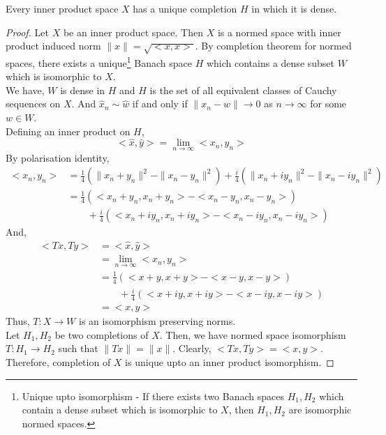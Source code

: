 \begin{theorem}
	Every inner product space $X$ has a unique completion $H$ in which it is dense.
\end{theorem}
\begin{proof}
	Let $X$ be an inner product space.
	Then $X$ is a normed space with inner product induced norm $\|x\| = \sqrt{<x,x>}$.
	By completion theorem for normed spaces, there exists a unique\dag\footnote{
		Unique upto isomorphism - 
		If there exists two Banach spaces $H_1,H_2$ which contain a dense subset which is isomorphic to $X$, then $H_1,H_2$ are isomorphic normed spaces.} 
	Banach space $H$ which contains a dense subset $W$ which is isomorphic to $X$.\\
	
	We have, $W$ is dense in $H$ and $H$ is the set of all equivalent classes of Cauchy sequences on $X$.
	And $\hat{x}_n \sim \hat{w}$ if and only if $\|x_n - w\| \to 0$ as $n \to \infty$ for some $w \in W$.\\

	Defining an inner product on $H$,
	\[ <\hat{x},\hat{y}> = \lim_{n \to \infty} <x_n,y_n> \]
	By polarisation identity, 
	\begin{align*}
		<x_n,y_n> 
		& = \frac{1}{4} \left( \|x_n+y_n\|^2 - \|x_n-y_n\|^2 \right) + \frac{i}{4}\left( \|x_n+iy_n\|^2 - \|x_n-iy_n\|^2 \right) \\
		& = \frac{1}{4} \left( <x_n+y_n,x_n+y_n> - <x_n-y_n,x_n-y_n> \right) \\
		& \qquad + \frac{i}{4} \left( <x_n+iy_n,x_n+iy_n> - <x_n-iy_n,x_n-iy_n> \right) 
	\end{align*}
	And,
	\begin{align*}
		<Tx,Ty> 
		& = <\hat{x},\hat{y}>\\
		& = \lim_{n \to \infty} <x_n,y_n> \\
		& = \frac{1}{4} \left( <x+y,x+y>-<x-y,x-y> \right) \\
		&\qquad + \frac{i}{4} \left( <x+iy,x+iy> - <x-iy,x-iy> \right)\\
		& = <x,y>
	\end{align*}
	Thus, $T : X \to W$ is an isomorphism preserving norms.\\

	Let $H_1,H_2$ be two completions of $X$.
	Then, we have normed space isomorphism $T : H_1 \to H_2$ such that $\|Tx\| = \|x\|$.
	Clearly, $<Tx,Ty> = <x,y>$.
	Therefore, completion of $X$ is unique upto an inner product isomorphism.
\end{proof}

